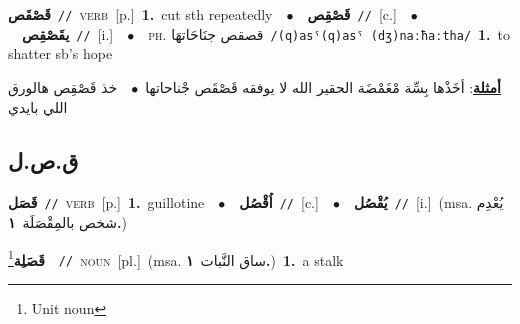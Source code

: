 \documentclass[10pt,a4paper,twoside]{article} %
\begin{document}
\begin{multicols}{2}
{\setlength\topsep{0pt}\textbf{\foreignlanguage{arabic}{قَصْقَص}}\ {\color{gray}\texttt{//}\color{black}}\ \textsc{verb}\ [p.]\ \textbf{1.}~cut sth repeatedly\ \ $\bullet$\ \ \setlength\topsep{0pt}\textbf{\foreignlanguage{arabic}{قَصْقِص}}\ {\color{gray}\texttt{//}\color{black}}\ [c.]\ \ $\bullet$\ \ \setlength\topsep{0pt}\textbf{\foreignlanguage{arabic}{يقَصْقِص}}\ {\color{gray}\texttt{//}\color{black}}\ [i.]\ \ $\bullet$\ \ \textsc{ph.} \color{gray} \foreignlanguage{arabic}{قصقص جنَاحَاتهَا}\color{black}\ {\color{gray}\texttt{/{\sffamily (q)asˤ(q)asˤ (dʒ)naːħaːtha}/}\color{black}}\ \textbf{1.}~to shatter sb's hope\  \begin{flushright}\color{gray}\foreignlanguage{arabic}{\textbf{\underline{\foreignlanguage{arabic}{أمثلة}}}: أخَذْها بِسِّة مْغَمْضَة الحقير الله لا يوفقه قَصْقَص جْناحاتها\ $\bullet$\ \  خذ قَصْقِص هالورق اللي بايدي}\end{flushright}\color{black}} \vspace{2mm}

\vspace{-3mm}
\subsection*{\color{blue}\foreignlanguage{arabic}{ق.ص.ل}\color{blue}{}} 

{\setlength\topsep{0pt}\textbf{\foreignlanguage{arabic}{قَصَل}}\ {\color{gray}\texttt{//}\color{black}}\ \textsc{verb}\ [p.]\ \textbf{1.}~guillotine\ \ $\bullet$\ \ \setlength\topsep{0pt}\textbf{\foreignlanguage{arabic}{اُقْصُل}}\ {\color{gray}\texttt{//}\color{black}}\ [c.]\ \ $\bullet$\ \ \setlength\topsep{0pt}\textbf{\foreignlanguage{arabic}{يُقْصُل}}\ {\color{gray}\texttt{//}\color{black}}\ [i.]\ \color{gray}(msa. \foreignlanguage{arabic}{يُعْدِم شخص بالمِقْصَلَة}~\foreignlanguage{arabic}{\textbf{١.}})\color{black}\ } \vspace{2mm}

{\setlength\topsep{0pt}\textbf{\foreignlanguage{arabic}{قَصَلِة}}\footnote{Unit noun}\ \ {\color{gray}\texttt{//}\color{black}}\ \textsc{noun}\ [pl.]\ \color{gray}(msa. \foreignlanguage{arabic}{ساق النَّبات}~\foreignlanguage{arabic}{\textbf{١.}})\color{black}\ \textbf{1.}~a stalk\ } \vspace{2mm}


\end{multicols}
\end{document}
